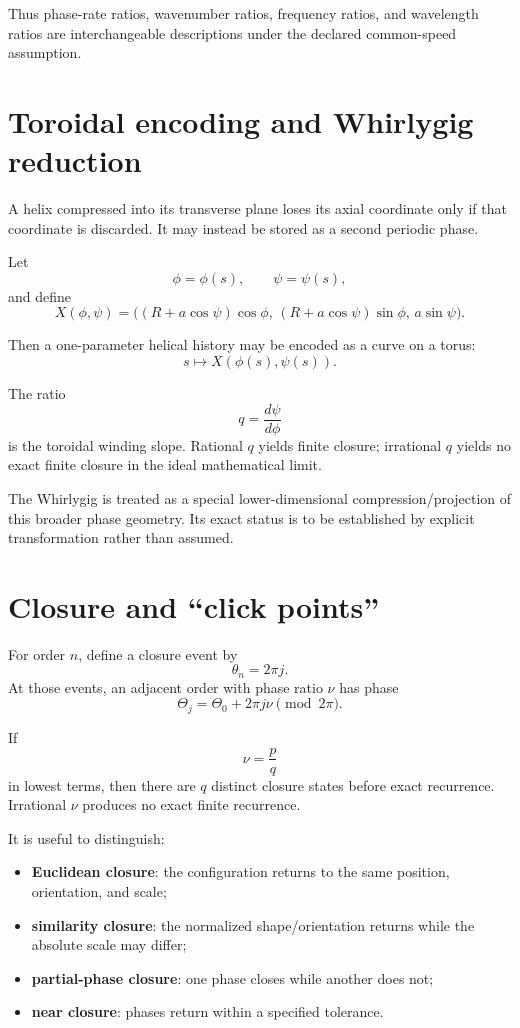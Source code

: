 \documentclass[11pt]{article}
\begin{document}
Thus phase-rate ratios, wavenumber ratios, frequency ratios, and wavelength
ratios are interchangeable descriptions under the declared common-speed
assumption.

\section{Toroidal encoding and Whirlygig reduction}

A helix compressed into its transverse plane loses its axial coordinate only if
that coordinate is discarded.  It may instead be stored as a second periodic
phase.

Let
\[
\phi=\phi(s),
\qquad
\psi=\psi(s),
\]
and define
\[
X(\phi,\psi)
=
\bigl(
(R+a\cos\psi)\cos\phi,\,
(R+a\cos\psi)\sin\phi,\,
a\sin\psi
\bigr).
\]

Then a one-parameter helical history may be encoded as a curve on a torus:
\[
s\mapsto X(\phi(s),\psi(s)).
\]

The ratio
\[
q=\frac{d\psi}{d\phi}
\]
is the toroidal winding slope.  Rational $q$ yields finite closure; irrational
$q$ yields no exact finite closure in the ideal mathematical limit.

The Whirlygig is treated as a special lower-dimensional
compression/projection of this broader phase geometry.  Its exact status is to
be established by explicit transformation rather than assumed.

\section{Closure and ``click points''}

For order $n$, define a closure event by
\[
\theta_n=2\pi j.
\]
At those events, an adjacent order with phase ratio $\nu$ has phase
\[
\Theta_j
=
\Theta_0+2\pi j\nu
\pmod{2\pi}.
\]

If
\[
\nu=\frac{p}{q}
\]
in lowest terms, then there are $q$ distinct closure states before exact
recurrence.  Irrational $\nu$ produces no exact finite recurrence.

It is useful to distinguish:
\begin{itemize}
    \item \textbf{Euclidean closure}: the configuration returns to the same
          position, orientation, and scale;
    \item \textbf{similarity closure}: the normalized shape/orientation returns
          while the absolute scale may differ;
    \item \textbf{partial-phase closure}: one phase closes while another does not;
    \item \textbf{near closure}: phases return within a specified tolerance.
\end{itemize}
\end{document}
